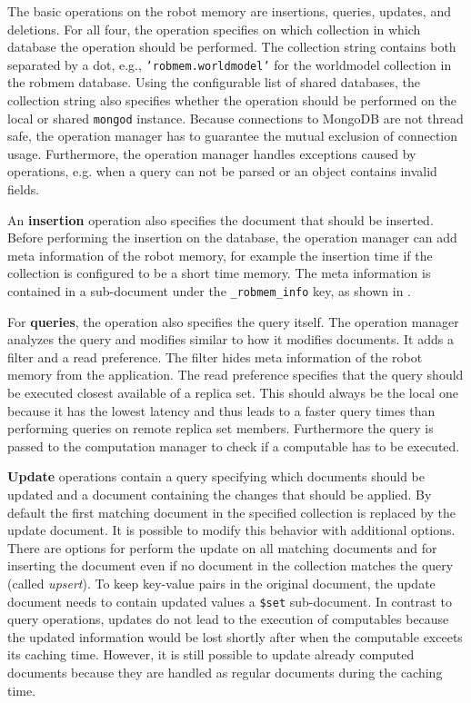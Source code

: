 The basic operations on the robot memory are insertions, queries,
updates, and deletions. For all four, the operation specifies on which
collection in which database the operation should be performed. The
collection string contains both separated by a dot,
e.g., \texttt{'robmem.worldmodel'} for the worldmodel collection in
the robmem database. Using
the configurable list of shared databases, the collection string also
specifies whether the operation should be performed on the local or
shared \texttt{mongod} instance. Because connections to MongoDB
are not thread safe, the operation manager has to guarantee the
mutual exclusion of connection usage. Furthermore, the operation
manager handles exceptions caused by operations, e.g. when a query can
not be parsed or an object contains invalid fields.

An \textbf{insertion} operation also specifies the document that
should be inserted. Before performing the insertion on the database,
the operation manager can add meta information of the robot memory,
for example the insertion time if the collection is configured to be a
short time memory. The meta information is contained in a sub-document
under the \texttt{\_robmem\_info} key, as shown in
.

For \textbf{queries}, the operation also specifies the query
itself. The operation manager analyzes the query and modifies similar
to how it modifies documents. It adds a filter and a read
preference. The filter hides meta information of the robot memory from
the application. The read preference specifies that the query should
be executed closest available of a replica set. This should always be
the local one because it has the lowest latency and thus leads to a
faster query times than performing queries on remote replica set
members. Furthermore the query is passed to the computation manager to
check if a computable has to be executed.

\textbf{Update} operations contain a query specifying which documents
should be updated and a document containing the changes that should be
applied. By default the first matching document in the specified
collection is replaced by the update document. It is possible to
modify this behavior with additional options. There are options for
perform the update on all matching documents and for inserting the
document even if no document in the collection matches the query
(called \emph{upsert}). To keep key-value pairs in the original
document, the update document needs to contain updated values a
\texttt{\$set} sub-document. In contrast to
query operations, updates do not lead to the execution of computables
because the updated information would be lost shortly after when the computable
exceets its caching time. However, it is still possible to update
already computed documents because they are handled as regular
documents during the caching time.

